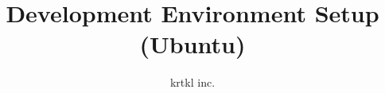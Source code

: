 
%
%
\title{Development Environment Setup (Ubuntu)}
\author{krtkl inc.}

\makeatletter




	\maketitle

	
	
	



